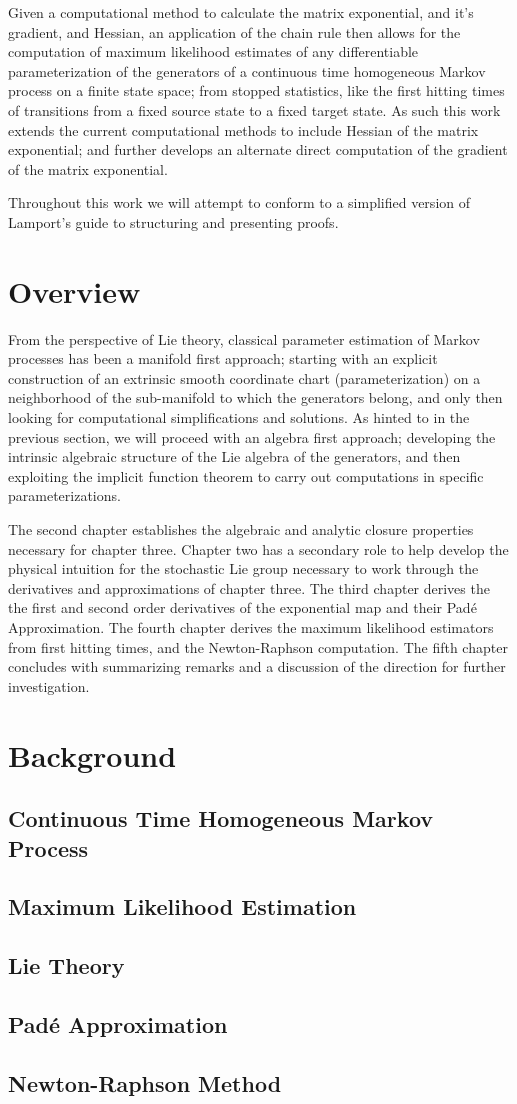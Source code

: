 Given a computational method to calculate the matrix exponential, and it's 
gradient, and Hessian, an application of the chain rule then allows for the 
computation of maximum likelihood estimates of any differentiable
parameterization of the generators of a continuous time homogeneous Markov 
process on a finite state space; from stopped statistics, like the first hitting 
times of transitions from a fixed source state to a fixed target state. As such 
this work extends the current computational methods to include Hessian of the 
matrix exponential; and further develops an alternate direct computation of the 
gradient of the matrix exponential.

Throughout this work we will attempt to conform to a simplified version of 
Lamport's guide to structuring and presenting proofs\cite{lamport_how_2012}.

\section{Overview}
From the perspective of Lie theory, classical parameter estimation of Markov 
processes has been a manifold first approach; starting with an explicit 
construction of an extrinsic smooth coordinate chart (parameterization) on a 
neighborhood of the sub-manifold to which the generators belong, and only then 
looking for computational simplifications and solutions. As hinted to in the 
previous section, we will proceed with an algebra first approach; developing the 
intrinsic algebraic structure of the Lie algebra of the generators, and then 
exploiting the implicit function theorem to carry out computations in specific 
parameterizations.

The second chapter establishes the algebraic and analytic closure properties
necessary for chapter three. Chapter two has a secondary role to help develop the 
physical intuition for the stochastic Lie group necessary to work through the 
derivatives and approximations of chapter three.
The third chapter derives the the first and second order derivatives of the exponential
map and their Pad\'{e} Approximation.
The fourth chapter derives the maximum likelihood estimators from first hitting times, and the Newton-Raphson computation.
The fifth chapter concludes with summarizing remarks and a discussion of the direction
for further investigation.
\section{Background}
\subsection{Continuous Time Homogeneous Markov Process}
\subsection{Maximum Likelihood Estimation}
\subsection{Lie Theory}
\subsection{Pad\'{e} Approximation}
\subsection{Newton-Raphson Method}
